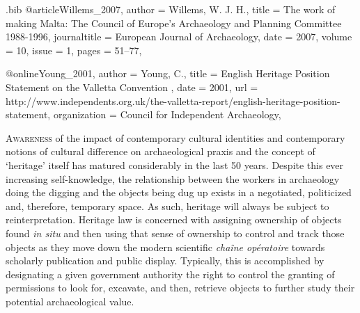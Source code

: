 \begin{filecontents}{\IJSRAidentifier.bib}
@article{Willems_2007,
	author = {Willems, W. J. H.},
	title = {The work of making Malta: The Council of Europe’s Archaeology and Planning Committee 1988-1996},
	journaltitle = {European Journal of Archaeology},
	date = {2007},
	volume = {10},
	issue = {1},
	pages = {51--77},
}

@online{Young_2001,
	author = {Young, C.},
	title = {English Heritage Position Statement on the Valletta Convention },
	date = {2001},
	url = {http://www.independents.org.uk/the-valletta-report/english-heritage-position-statement},
	organization = {Council for Independent Archaeology},
}


\end{filecontents}

%
\IJSRAopening
\lettrine{A}{wareness} of the impact of contemporary cultural identities and contemporary notions of cultural difference on archaeological praxis and the concept of ‘heritage’ itself has matured considerably in the last 50 years. Despite this ever increasing self-knowledge, the relationship between the workers in archaeology  doing the digging and the objects being dug up exists in a negotiated, politicized and, therefore, temporary space. As such, heritage will always be subject to reinterpretation. Heritage law is concerned with assigning ownership of objects found \textit{in situ} and then using that sense of ownership to control and track those objects as they move down the modern scientific \textit{chaîne opératoire} towards scholarly publication and public display. Typically, this is accomplished by designating a given government authority the right to control the granting of permissions to look for, excavate, and then, retrieve objects to further study their potential archaeological value.

